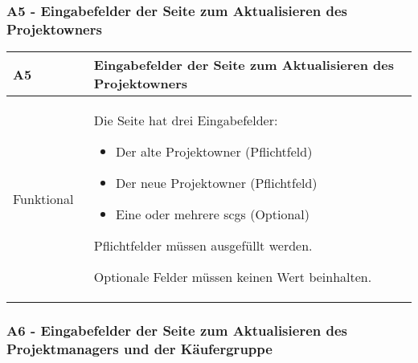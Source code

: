 \subsubsection[A5 - Eingabefelder der Seite zum Aktualisieren des Projektowners]{A5 - Eingabefelder der Seite zum Aktualisieren des Projektowners}

\begin{center}
    \begin{tabular}{ |p{0.2\linewidth}|p{0.8\linewidth}| } 
        \hline
        \rowcolor{lightgray}
        \textbf{A5} & \textbf{Eingabefelder der Seite zum Aktualisieren des Projektowners} \\
        \hline
        Funktional & Die Seite hat drei Eingabefelder:
        \begin{itemize}
            \item Der alte Projektowner (Pflichtfeld)
            \item Der neue Projektowner (Pflichtfeld)
            \item Eine oder mehrere \acsp{scg} (Optional)
        \end{itemize} 
        Pflichtfelder müssen ausgefüllt werden. 
        
        Optionale Felder müssen keinen Wert beinhalten.\\ 
        \hline
    \end{tabular}
\end{center}

\subsubsection[A6 - Eingabefelder der Seite zum Aktualisieren des Projektmanagers und der Käufergruppe]{A6 - Eingabefelder der Seite zum Aktualisieren des Projektmanagers und der Käufergruppe}

